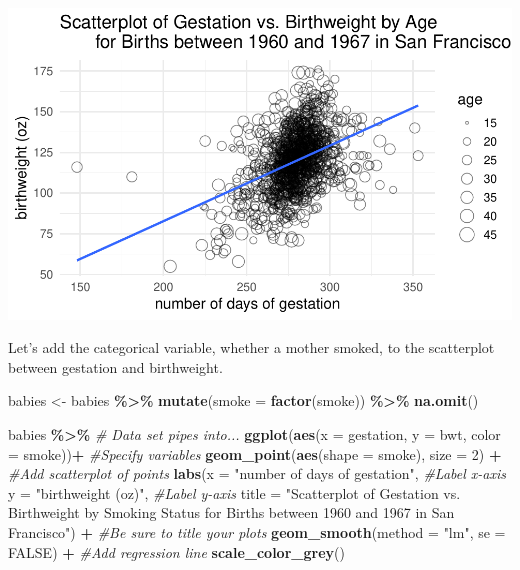 \documentclass[
]{report}
\newenvironment{Shaded}{\begin{snugshade}}{\end{snugshade}}
\newcommand{\AttributeTok}[1]{\textcolor[rgb]{0.13,0.29,0.53}{#1}}
\newcommand{\CommentTok}[1]{\textcolor[rgb]{0.56,0.35,0.01}{\textit{#1}}}
\newcommand{\ConstantTok}[1]{\textcolor[rgb]{0.56,0.35,0.01}{#1}}
\newcommand{\DecValTok}[1]{\textcolor[rgb]{0.00,0.00,0.81}{#1}}
\newcommand{\FunctionTok}[1]{\textcolor[rgb]{0.13,0.29,0.53}{\textbf{#1}}}
\newcommand{\NormalTok}[1]{#1}
\newcommand{\OtherTok}[1]{\textcolor[rgb]{0.56,0.35,0.01}{#1}}
\newcommand{\SpecialCharTok}[1]{\textcolor[rgb]{0.81,0.36,0.00}{\textbf{#1}}}
\newcommand{\StringTok}[1]{\textcolor[rgb]{0.31,0.60,0.02}{#1}}
\begin{document}
\begin{center}\includegraphics[width=0.8\linewidth]{04-LN04-two-quantitativeEDA_files/figure-latex/unnamed-chunk-7-1} \end{center}

\newpage

Let's add the categorical variable, whether a mother smoked, to the scatterplot between gestation and birthweight.

\begin{Shaded}
\begin{Highlighting}[]
\NormalTok{babies }\OtherTok{\textless{}{-}}\NormalTok{ babies }\SpecialCharTok{\%\textgreater{}\%} 
    \FunctionTok{mutate}\NormalTok{(}\AttributeTok{smoke =} \FunctionTok{factor}\NormalTok{(smoke)) }\SpecialCharTok{\%\textgreater{}\%}
    \FunctionTok{na.omit}\NormalTok{()}
           
\NormalTok{babies }\SpecialCharTok{\%\textgreater{}\%} \CommentTok{\# Data set pipes into...}
    \FunctionTok{ggplot}\NormalTok{(}\FunctionTok{aes}\NormalTok{(}\AttributeTok{x =}\NormalTok{ gestation, }\AttributeTok{y =}\NormalTok{ bwt, }\AttributeTok{color =}\NormalTok{ smoke))}\SpecialCharTok{+}  \CommentTok{\#Specify variables}
    \FunctionTok{geom\_point}\NormalTok{(}\FunctionTok{aes}\NormalTok{(}\AttributeTok{shape =}\NormalTok{ smoke), }\AttributeTok{size =} \DecValTok{2}\NormalTok{) }\SpecialCharTok{+}  \CommentTok{\#Add scatterplot of points}
    \FunctionTok{labs}\NormalTok{(}\AttributeTok{x =} \StringTok{"number of days of gestation"}\NormalTok{,  }\CommentTok{\#Label x{-}axis}
         \AttributeTok{y =} \StringTok{"birthweight (oz)"}\NormalTok{,  }\CommentTok{\#Label y{-}axis}
         \AttributeTok{title =} \StringTok{"Scatterplot of Gestation vs. Birthweight by }
\StringTok{         Smoking Status for Births between 1960 and 1967 }
\StringTok{         in San Francisco"}\NormalTok{) }\SpecialCharTok{+} 
    \CommentTok{\#Be sure to title your plots}
    \FunctionTok{geom\_smooth}\NormalTok{(}\AttributeTok{method =} \StringTok{"lm"}\NormalTok{, }\AttributeTok{se =} \ConstantTok{FALSE}\NormalTok{) }\SpecialCharTok{+} \CommentTok{\#Add regression line}
    \FunctionTok{scale\_color\_grey}\NormalTok{()}
\end{Highlighting}
\end{Shaded}
\end{document}
